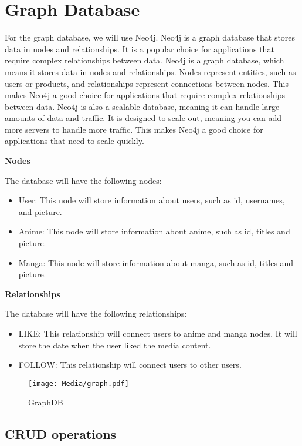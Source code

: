 \newpage
\section{Graph Database}
For the graph database, we will use Neo4j. Neo4j is a graph database that stores data in nodes and relationships. It is a popular choice for applications that require complex relationships between data. Neo4j is a graph database, which means it stores data in nodes and relationships. Nodes represent entities, such as users or products, and relationships represent connections between nodes. This makes Neo4j a good choice for applications that require complex relationships between data. Neo4j is also a scalable database, meaning it can handle large amounts of data and traffic. It is designed to scale out, meaning you can add more servers to handle more traffic. This makes Neo4j a good choice for applications that need to scale quickly.

\textbf{Nodes}

The database will have the following nodes:
\begin{itemize}
    \item User: This node will store information about users, such as id, usernames, and picture.
    \item Anime: This node will store information about anime, such as id, titles and picture.
    \item Manga: This node will store information about manga, such as id, titles and picture.
\end{itemize}

\textbf{Relationships}

The database will have the following relationships:
\begin{itemize}
    \item LIKE: This relationship will connect users to anime and manga nodes. It will store the date when the user liked the media content.
    \item FOLLOW: This relationship will connect users to other users. 
\end{itemize}

\begin{figure}[htbp]
    \centering
    \texttt{[image: Media/graph.pdf]}
    \caption{GraphDB}
    \label{fig:GraohDB}
\end{figure}

\newpage

\subsection{CRUD operations}

